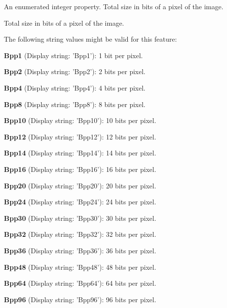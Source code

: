 An enumerated integer property. Total size in bits of a pixel of the image. 

Total size in bits of a pixel of the image.

The following string values might be valid for this feature\+:
\begin{DoxyItemize}
\item {\bfseries Bpp1} (Display string\+: 'Bpp1')\+: 1 bit per pixel.
\item {\bfseries Bpp2} (Display string\+: 'Bpp2')\+: 2 bits per pixel.
\item {\bfseries Bpp4} (Display string\+: 'Bpp4')\+: 4 bits per pixel.
\item {\bfseries Bpp8} (Display string\+: 'Bpp8')\+: 8 bits per pixel.
\item {\bfseries Bpp10} (Display string\+: 'Bpp10')\+: 10 bits per pixel.
\item {\bfseries Bpp12} (Display string\+: 'Bpp12')\+: 12 bits per pixel.
\item {\bfseries Bpp14} (Display string\+: 'Bpp14')\+: 14 bits per pixel.
\item {\bfseries Bpp16} (Display string\+: 'Bpp16')\+: 16 bits per pixel.
\item {\bfseries Bpp20} (Display string\+: 'Bpp20')\+: 20 bits per pixel.
\item {\bfseries Bpp24} (Display string\+: 'Bpp24')\+: 24 bits per pixel.
\item {\bfseries Bpp30} (Display string\+: 'Bpp30')\+: 30 bits per pixel.
\item {\bfseries Bpp32} (Display string\+: 'Bpp32')\+: 32 bits per pixel.
\item {\bfseries Bpp36} (Display string\+: 'Bpp36')\+: 36 bits per pixel.
\item {\bfseries Bpp48} (Display string\+: 'Bpp48')\+: 48 bits per pixel.
\item {\bfseries Bpp64} (Display string\+: 'Bpp64')\+: 64 bits per pixel.
\item {\bfseries Bpp96} (Display string\+: 'Bpp96')\+: 96 bits per pixel.
\end{DoxyItemize}

